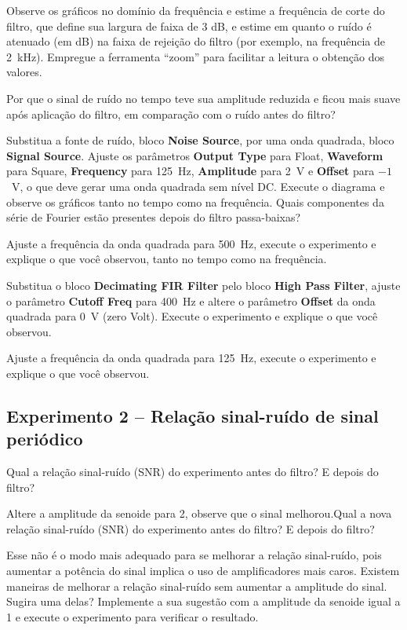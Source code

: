 \documentclass[12pt,addpoints]{exam}
\begin{document}
\begin{questions}
    \question Observe os gráficos no domínio da frequência e estime a frequência de corte do filtro, que define sua largura de faixa de 3 dB, e estime em quanto o ruído é atenuado (em dB) na faixa de rejeição do filtro (por exemplo, na frequência de 2~kHz). Empregue a ferramenta ``zoom'' para facilitar a leitura o obtenção dos valores.
    \fillwithlines{0.25in}
    
    \question Por que o sinal de ruído no tempo teve sua amplitude reduzida e ficou mais suave após aplicação do filtro, em comparação com o ruído antes do filtro?
    \fillwithlines{0.5in}

    \question Substitua a fonte de ruído, bloco \textbf{Noise Source}, por uma onda quadrada, bloco \textbf{Signal Source}. Ajuste os parâmetros \textbf{Output Type} para Float, \textbf{Waveform} para Square, \textbf{Frequency} para 125~Hz, \textbf{Amplitude} para 2~V e \textbf{Offset} para $-1$~V, o que deve gerar uma onda quadrada sem nível DC. Execute o diagrama e observe os gráficos tanto no tempo como na frequência. Quais componentes da série de Fourier estão presentes depois do filtro passa-baixas?
    \fillwithlines{0.5in}
    
    \question Ajuste a frequência da onda quadrada para 500~Hz, execute o experimento e explique o que você observou, tanto no tempo como na frequência.
    \fillwithlines{0.5in}
    
    \question Substitua o bloco \textbf{Decimating FIR Filter} pelo bloco \textbf{High Pass Filter}, ajuste o parâmetro \textbf{Cutoff Freq} para 400~Hz e altere o parâmetro \textbf{Offset} da onda quadrada para 0~V (zero Volt). Execute o experimento e explique o que você observou.
    \fillwithlines{0.5in}
    
    \question Ajuste a frequência da onda quadrada para 125~Hz, execute o experimento e explique o que você observou.
    \fillwithlines{0.5in}
\end{questions}

\subsection*{Experimento 2 -- Relação sinal-ruído de sinal periódico}

\begin{questions}
    \question Qual a relação sinal-ruído (SNR) do experimento antes do filtro? E depois do filtro?
    \fillwithlines{0.25in}
    
    \question Altere a amplitude da senoide para 2, observe que o sinal melhorou.Qual a nova relação sinal-ruído (SNR) do experimento antes do filtro? E depois do filtro?
    \fillwithlines{0.5in}
    
    \question Esse não é o modo mais adequado para se melhorar a relação sinal-ruído, pois aumentar a potência do sinal implica o uso de amplificadores mais caros. Existem maneiras de melhorar a relação sinal-ruído sem aumentar a amplitude do sinal. Sugira uma delas? Implemente a sua sugestão com a amplitude da senoide igual a 1 e execute o experimento para verificar o resultado.
    \fillwithlines{0.5in}
\end{questions}
\end{document}
